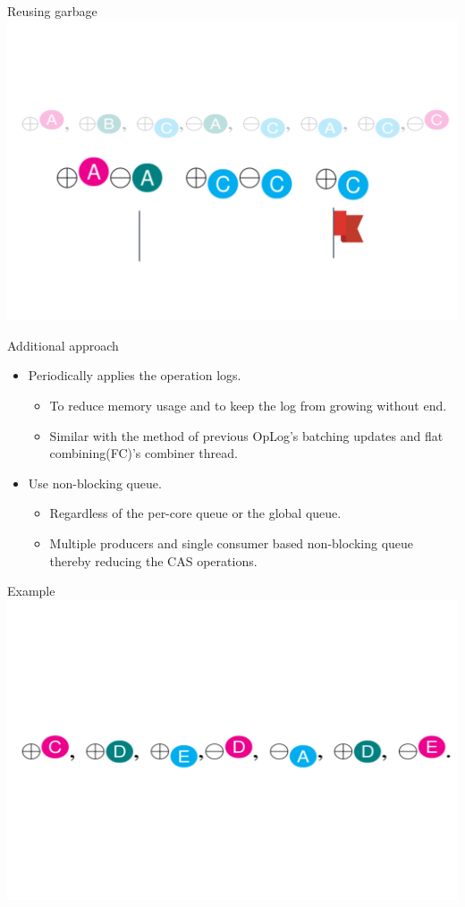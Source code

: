 \documentclass[english]{beamer} %
\begin{document}
\begin{frame}{Reusing garbage }
\includegraphics[scale=0.5]{fig/reusing_garbage_2}
\end{frame}

\begin{frame}{Additional approach}
	\begin{itemize}
	\item Periodically applies the operation logs.
	\begin{itemize}
	\item To reduce memory usage and to keep the log from growing without
	end.
	\item Similar with the method of previous OpLog’s batching
	updates and flat combining(FC)’s combiner thread.
	\end{itemize}
	\item Use non-blocking queue.
	\begin{itemize}
	  \item Regardless of the per-core queue or the global
	  queue.
	  \item Multiple producers and single consumer based non-blocking queue
	  thereby reducing the CAS operations.
	\end{itemize}
	\end{itemize}
\end{frame}


\begin{frame}{Example}
\includegraphics[scale=0.5]{fig/example}
\end{frame}
\end{document}
